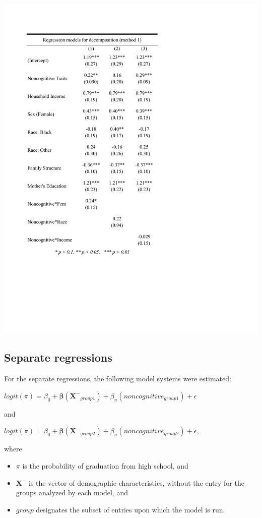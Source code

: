 \documentclass[11pt]{article}
\begin{document}
{\centering
\includegraphics[scale=0.8]{decomp1.pdf}\\}

\subsection{Separate regressions}
For the separate regressions, the following model systems were estimated:

\vspace{5mm}
$logit(\pi) = \beta_0 + \boldsymbol{\beta}(\mathbf{X^-}_{group1}) + \beta_{n}(noncognitive_{group1}) + \epsilon$

\noindent and

$logit(\pi) = \beta_0 + \boldsymbol{\beta}(\mathbf{X^-}_{group2}) + \beta_{n} (noncognitive_{group2}) + \epsilon,$

\vspace{5mm}

\noindent where
\begin{itemize}\itemsep1pt \parskip0pt 
	\item $\pi$ is the probability of graduation from high school, and
	\item $\mathbf{X^-}$ is the vector of demographic characteristics, without the entry for the groups analyzed by each model, and
	\item $group$ designates the subset of entries upon which the model is run.
\end{itemize}
\end{document}
